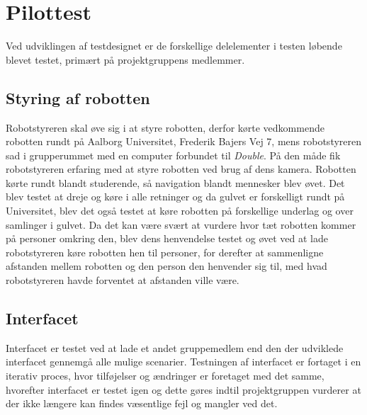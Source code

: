 \section{Pilottest}
\label{ParametrePilottest}
%
Ved udviklingen af testdesignet er de forskellige delelementer i testen løbende blevet testet, primært på projektgruppens medlemmer. \blankline
%
\subsection*{Styring af robotten}
Robotstyreren skal øve sig i at styre robotten, derfor kørte vedkommende robotten rundt på Aalborg Universitet, Frederik Bajers Vej 7, mens robotstyreren sad i grupperummet med en computer forbundet til \textit{Double}. På den måde fik robotstyreren erfaring med at styre robotten ved brug af dens kamera. Robotten kørte rundt blandt studerende, så navigation blandt mennesker blev øvet. Det blev testet at dreje og køre i alle retninger og da gulvet er forskelligt rundt på Universitet, blev det også testet at køre robotten på forskellige underlag og over samlinger i gulvet. 
% 
Da det kan være svært at vurdere hvor tæt robotten kommer på personer omkring den, blev dens henvendelse testet og øvet ved at lade robotstyreren køre robotten hen til personer, for derefter at sammenligne afstanden mellem robotten og den person den henvender sig til, med hvad robotstyreren havde forventet at afstanden ville være. \blankline
%
\subsection*{Interfacet}
Interfacet er testet ved at lade et andet gruppemedlem end den der udviklede interfacet gennemgå alle mulige scenarier. Testningen af interfacet er fortaget i en iterativ proces, hvor tilføjelser og ændringer er foretaget med det samme, hvorefter interfacet er testet igen og dette gøres indtil projektgruppen vurderer at der ikke længere kan findes væsentlige fejl og mangler ved det. \blankline
%
